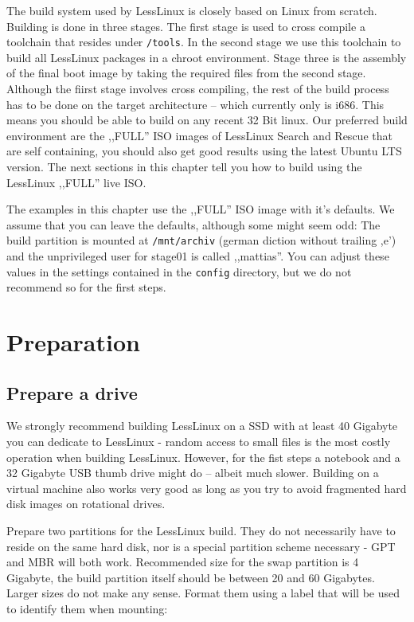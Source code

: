 
The build system used by LessLinux is closely based on Linux from scratch. Building is done in three stages. The first stage is used to cross compile a toolchain that resides under \texttt{/tools}. In the second stage we use this toolchain to build all LessLinux packages in a chroot environment. Stage three is the assembly of the final boot image by taking the required files from the second stage. Although the fiirst stage involves cross compiling, the rest of the build process has to be done on the target architecture -- which currently only is i686. This means you should be able to build on any recent 32 Bit linux. Our preferred build environment  are the ,,FULL'' ISO images of LessLinux Search and Rescue that are self containing, you should also get good results using the latest Ubuntu LTS version. The next sections in this chapter tell you how to build using the LessLinux ,,FULL'' live ISO.

The examples in this chapter use the ,,FULL'' ISO image with it's defaults. We assume that you can leave the defaults, although some might seem odd: The build partition is mounted at \texttt{/mnt/archiv} (german diction without trailing ,e') and the unprivileged user for stage01  is called ,,mattias''. You can adjust these values in the settings contained in the \texttt{config} directory, but we do not recommend so for the first steps.

\section{Preparation}

\subsection{Prepare a drive}

We strongly recommend building LessLinux on a SSD with at least 40 Gigabyte you can dedicate to LessLinux - random access to small files is the most costly operation when building LessLinux. However, for the fist steps a notebook and a 32 Gigabyte USB thumb drive might do -- albeit much slower. Building on a virtual machine also works very good as long as you try to avoid fragmented hard disk images on rotational drives.

Prepare two partitions for the LessLinux build. They do not necessarily have to reside on the same hard disk, nor is a special partition scheme necessary - GPT and MBR will both work. Recommended size for the swap partition is 4 Gigabyte, the build partition itself should be between 20 and 60 Gigabytes. Larger sizes do not make any sense. Format them using a label that will be used to identify them when mounting:

